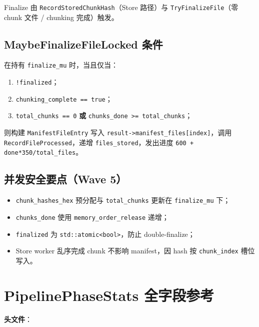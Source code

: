 Finalize 由 \texttt{RecordStoredChunkHash}（Store 路径）与 \texttt{TryFinalizeFile}（零 chunk 文件 / chunking 完成）触发。

\subsection{MaybeFinalizeFileLocked 条件}

在持有 \texttt{finalize\_mu} 时，当且仅当：
\begin{enumerate}
  \item \texttt{!finalized}；
  \item \texttt{chunking\_complete == true}；
  \item \texttt{total\_chunks == 0} \textbf{或} \texttt{chunks\_done >= total\_chunks}；
\end{enumerate}
则构建 \texttt{ManifestFileEntry} 写入 \texttt{result->manifest\_files[index]}，调用 \texttt{RecordFileProcessed}，递增 \texttt{files\_stored}，发出进度 \texttt{600 + done*350/total\_files}。

\subsection{并发安全要点（Wave 5）}

\begin{invariantbox}
\begin{itemize}[nosep]
  \item \texttt{chunk\_hashes\_hex} 预分配与 \texttt{total\_chunks} 更新在 \texttt{finalize\_mu} 下；
  \item \texttt{chunks\_done} 使用 \texttt{memory\_order\_release} 递增；
  \item \texttt{finalized} 为 \texttt{std::atomic<bool>}，防止 double-finalize；
  \item Store worker 乱序完成 chunk 不影响 manifest，因 hash 按 \texttt{chunk\_index} 槽位写入。
\end{itemize}
\end{invariantbox}

\section{PipelinePhaseStats 全字段参考}

\textbf{头文件}：

